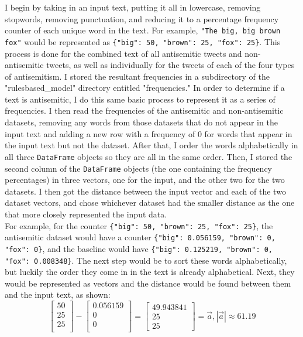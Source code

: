 \documentclass{article}
\begin{document}
I begin by taking in an input text, putting it all in lowercase, removing stopwords, removing punctuation, and reducing it to a percentage frequency counter of each unique word in the text. For example, \texttt{"The big, big brown fox"} would be represented as \texttt{\{"big": 50, "brown": 25, "fox": 25\}}. This process is done for the combined text of all antisemitic tweets and non-antisemitic tweets, as well as individually for the tweets of each of the four types of antisemitism. I stored the resultant frequencies in a subdirectory of the "rulesbased\_model" directory entitled "frequencies." In order to determine if a text is antisemitic, I do this same basic process to represent it as a series of frequencies. I then read the frequencies of the antisemitic and non-antisemitic datasets, removing any words from those datasets that do not appear in the input text and adding a new row with a frequency of 0 for words that appear in the input text but not the dataset. After that, I order the words alphabetically in all three \texttt{DataFrame} objects so they are all in the same order. Then, I stored the second column of the \texttt{DataFrame} objects (the one containing the frequency percentages) in three vectors, one for the input, and the other two for the two datasets. I then got the distance between the input vector and each of the two dataset vectors, and chose whichever dataset had the smaller distance as the one that more closely represented the input data.\\

For example, for the counter \texttt{\{"big": 50, "brown": 25, "fox": 25\}}, the antisemitic dataset would have a counter \texttt{\{"big": 0.056159, "brown": 0, "fox": 0\}}, and the baseline would have \texttt{\{"big": 0.125219, "brown": 0, "fox": 0.008348\}}. The next step would be to sort these words alphabetically, but luckily the order they come in in the text is already alphabetical. Next, they would be represented as vectors and the distance would be found between them and the input text, as shown:\\
\[
\left[ {\begin{array}{c}
    50\\
    25\\
    25\\
  \end{array} } \right] - \left[ {\begin{array}{c}
    0.056159\\
    0\\
    0\\
  \end{array} } \right] = \left[ {\begin{array}{c}
    49.943841\\
    25\\
    25\
  \end{array} } \right] = \vec{a} , \left| \vec{a} \right| \approx 61.19
\]
\end{document}
